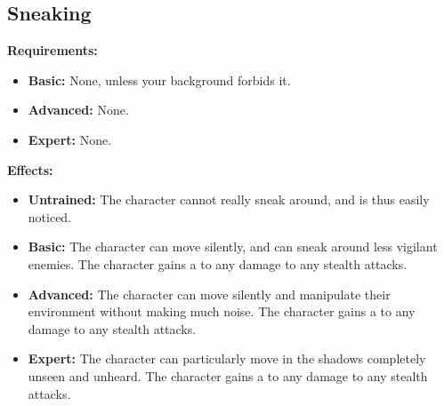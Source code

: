 \documentclass[openany,10pt,a4paper]{book}
\begin{document}
\subsection{Sneaking}
\begin{table}[!ht]
\centering
{}
\end{table}
\textbf{Requirements:}
\begin{itemize}
	\item \textbf{Basic:} None, unless your background forbids it.
	\item \textbf{Advanced:} None.
	\item \textbf{Expert:} None.
\end{itemize}
\textbf{Effects:}
\begin{itemize}
	\item \textbf{Untrained:} The character cannot really sneak around, and is thus easily noticed.
	\item \textbf{Basic:} The character can move silently, and can sneak around less vigilant enemies. The character gains a  to any damage to any stealth attacks.
	\item \textbf{Advanced:} The character can move silently and manipulate their environment without making much noise. The character gains a  to any damage to any stealth attacks.
	\item \textbf{Expert:} The character can particularly move in the shadows completely unseen and unheard. The character gains a  to any damage to any stealth attacks.
\end{itemize}\newpage
\end{document}
